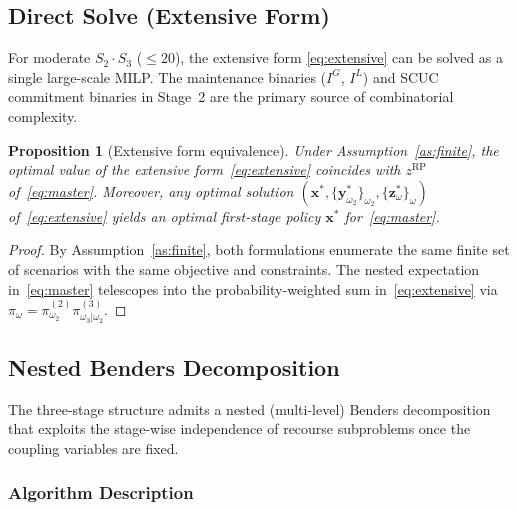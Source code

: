\documentclass[11pt]{article}
\newtheorem{proposition}{Proposition}
\begin{document}
\subsection{Direct Solve (Extensive Form)}\label{sec:ef}

For moderate $S_2 \cdot S_3$ ($\leq 20$), the extensive form
\eqref{eq:extensive} can be solved as a single large-scale MILP. The
maintenance binaries ($I^{G}$, $I^{L}$) and SCUC commitment binaries
in Stage~2 are the primary source of combinatorial complexity.

\begin{proposition}[Extensive form equivalence]\label{prop:ef}
Under Assumption~\ref{as:finite}, the optimal value of the extensive
form~\eqref{eq:extensive} coincides with $z^{\mathrm{RP}}$
of~\eqref{eq:master}. Moreover, any optimal solution
$(\mathbf{x}^*, \{\mathbf{y}^*_{\omega_2}\}_{\omega_2},
\{\mathbf{z}^*_\omega\}_\omega)$ of~\eqref{eq:extensive} yields an optimal
first-stage policy $\mathbf{x}^*$ for~\eqref{eq:master}.
\end{proposition}

\begin{proof}
By Assumption~\ref{as:finite}, both formulations enumerate the same
finite set of scenarios with the same objective and constraints. The
nested expectation in~\eqref{eq:master} telescopes into the
probability-weighted sum in~\eqref{eq:extensive} via
$\pi_\omega = \pi^{(2)}_{\omega_2}
\pi^{(3)}_{\omega_3|\omega_2}$.
\end{proof}

\subsection{Nested Benders Decomposition}\label{sec:benders}

The three-stage structure admits a nested (multi-level) Benders
decomposition that exploits the stage-wise independence of recourse
subproblems once the coupling variables are fixed.

\subsubsection{Algorithm Description}
\end{document}
